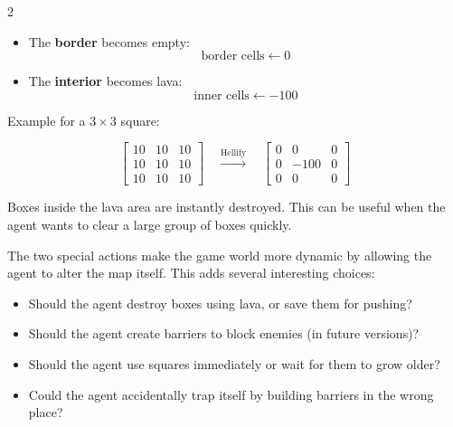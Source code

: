 \documentclass[a4paper]{article}
\begin{document}
\begin{multicols}{2}
\begin{itemize}
    \item The \textbf{border} becomes empty:
    \[
    \text{border cells} \leftarrow 0
    \]
    \item The \textbf{interior} becomes lava:
    \[
    \text{inner cells} \leftarrow -100
    \]
\end{itemize}

Example for a \(3 \times 3\) square:

\[
\begin{bmatrix}
10 & 10 & 10 \\
10 & 10 & 10 \\
10 & 10 & 10 
\end{bmatrix}
\quad \xrightarrow{\text{Hellify}} \quad
\begin{bmatrix}
0 & 0 & 0 \\
0 & -100 & 0 \\
0 & 0 & 0 
\end{bmatrix}
\]

Boxes inside the lava area are instantly destroyed. This can be useful when the agent wants to clear a large group of boxes quickly.

The two special actions make the game world more dynamic by allowing the agent to alter the map itself. This adds several interesting choices:

\begin{itemize}[label=*]
    \item Should the agent destroy boxes using lava, or save them for pushing?
    \item Should the agent create barriers to block enemies (in future versions)?
    \item Should the agent use squares immediately or wait for them to grow older?
    \item Could the agent accidentally trap itself by building barriers in the wrong place?
\end{itemize}






\end{multicols}
\end{document}
